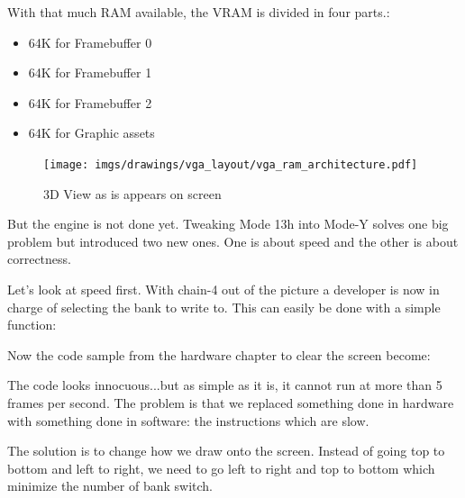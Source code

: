\documentclass[book.tex]{subfiles}
\begin{document}
 \par
 \begin{minipage}{\textwidth}

\end{minipage}
 \par
 With that much RAM available, the VRAM is divided in four parts.:
 \begin{itemize}\label{SetupPages}
 \item 64K for Framebuffer 0
 \item 64K for Framebuffer 1
 \item 64K for Framebuffer 2
 \item 64K for Graphic assets
\end{itemize}
\par
\begin{figure}[H]
\centering
 \texttt{[image: imgs/drawings/vga\_layout/vga\_ram\_architecture.pdf]}
 \caption{3D View as is appears on screen} \label{fig:vga_layout_in_3D}
 \end{figure}
\par
But the engine is not done yet. Tweaking Mode 13h into Mode-Y solves one big problem but introduced two new ones. One is about speed and the other is about correctness.\\
\par
Let's look at speed first. With chain-4 out of the picture a developer is now in charge of selecting the bank to write to. This can easily be done with a simple function:\\
\par
 \par
 \begin{minipage}{\textwidth}

\end{minipage}
 \par

Now the code sample from the hardware chapter to clear the screen become:\\
\par
\par
\begin{minipage}{\textwidth}

\end{minipage}
\par
The code looks innocuous...but as simple as it is, it cannot run at more than 5 frames per second. The problem is that we replaced something done in hardware with something done in software: the  instructions which are slow.\\
\par
The solution is to change how we draw onto the screen. Instead of going top to bottom and left to right, we need to go left to right and top to bottom which minimize the number of bank switch.
\end{document}
